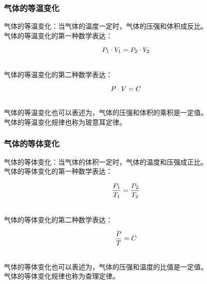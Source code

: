 \documentclass[UTF8]{ctexart}
\begin{document}
\newpage

\subsubsection{气体的等温变化}
    气体的等温变化：当气体的温度一定时，气体的压强和体积成反比。\\[3mm]
    气体的等温变化的第一种数学表达：
    \begin{large}
        \begin{equation*}
            P_1\cdot V_1=P_2\cdot V_2\vspace{-8pt}
        \end{equation*}
    \end{large}\\
    气体的等温变化的第二种数学表达：
    \begin{large}
        \begin{equation*}
            P\cdot V=C\vspace{-6pt}
        \end{equation*}
    \end{large}\\
    气体的等温变化也可以表述为，气体的压强和体积的乘积是一定值。\\[3mm]
    气体的等温变化规律也称为玻意耳定律。\vspace{7pt}

\subsubsection{气体的等体变化}
    气体的等体变化：当气体的体积一定时，气体的温度和压强成正比。\\[3mm]
    气体的等体变化的第一种数学表达：
    \begin{large}
        \begin{equation*}
            \frac{P_1}{T_1}=\frac{P_2}{T_2}\vspace{-3pt}
        \end{equation*}
    \end{large}\\
    气体的等体变化的第二种数学表达：
    \begin{large}
        \begin{equation*}
            \frac{P}{T}=C\vspace{-3pt}
        \end{equation*}
    \end{large}\\
    气体的等体变化也可以表述为，气体的压强和温度的比值是一定值。\\[3mm]
    气体的等体变化规律也称为查理定律。\vspace{7pt}
\end{document}
